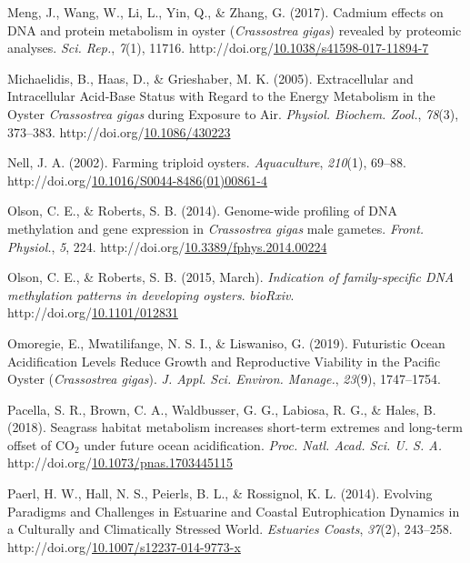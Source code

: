 \documentclass [11pt, proquest] {uwthesis}[2015/03/03]
\newlength{\cslhangindent}
\newenvironment{CSLReferences}%
{\setlength{\parindent}{0pt}%
\everypar{\setlength{\hangindent}{\cslhangindent}}\ignorespaces}%
{\par}
\begin{document}
\begin{CSLReferences}{1}{0}
\leavevmode\hypertarget{ref-Meng2017}{}%
Meng, J., Wang, W., Li, L., Yin, Q., \& Zhang, G. (2017). {Cadmium effects on DNA and protein metabolism in oyster (\emph{Crassostrea gigas}) revealed by proteomic analyses}. \emph{Sci. Rep.}, \emph{7}(1), 11716. http://doi.org/\href{https://doi.org/10.1038/s41598-017-11894-7}{10.1038/s41598-017-11894-7}

\leavevmode\hypertarget{ref-Michaelidis2005}{}%
Michaelidis, B., Haas, D., \& Grieshaber, M. K. (2005). {Extracellular and Intracellular Acid‐Base Status with Regard to the Energy Metabolism in the Oyster \emph{Crassostrea gigas} during Exposure to Air}. \emph{Physiol. Biochem. Zool.}, \emph{78}(3), 373--383. http://doi.org/\href{https://doi.org/10.1086/430223}{10.1086/430223}

\leavevmode\hypertarget{ref-Nell2002}{}%
Nell, J. A. (2002). {Farming triploid oysters}. \emph{Aquaculture}, \emph{210}(1), 69--88. http://doi.org/\href{https://doi.org/10.1016/S0044-8486(01)00861-4}{10.1016/S0044-8486(01)00861-4}

\leavevmode\hypertarget{ref-Olson2014}{}%
Olson, C. E., \& Roberts, S. B. (2014). {Genome-wide profiling of DNA methylation and gene expression in \emph{Crassostrea gigas} male gametes}. \emph{Front. Physiol.}, \emph{5}, 224. http://doi.org/\href{https://doi.org/10.3389/fphys.2014.00224}{10.3389/fphys.2014.00224}

\leavevmode\hypertarget{ref-Olson2015}{}%
Olson, C. E., \& Roberts, S. B. (2015, March). \emph{{Indication of family-specific DNA methylation patterns in developing oysters}}. \emph{bioRxiv}. http://doi.org/\href{https://doi.org/10.1101/012831}{10.1101/012831}

\leavevmode\hypertarget{ref-Omoregie2019}{}%
Omoregie, E., Mwatilifange, N. S. I., \& Liswaniso, G. (2019). {Futuristic Ocean Acidification Levels Reduce Growth and Reproductive Viability in the Pacific Oyster (\emph{Crassostrea gigas})}. \emph{J. Appl. Sci. Environ. Manage.}, \emph{23}(9), 1747--1754.

\leavevmode\hypertarget{ref-Pacella2018}{}%
Pacella, S. R., Brown, C. A., Waldbusser, G. G., Labiosa, R. G., \& Hales, B. (2018). {Seagrass habitat metabolism increases short-term extremes and long-term offset of {CO\(_2\)} under future ocean acidification}. \emph{Proc. Natl. Acad. Sci. U. S. A.} http://doi.org/\href{https://doi.org/10.1073/pnas.1703445115}{10.1073/pnas.1703445115}

\leavevmode\hypertarget{ref-Paerl2014}{}%
Paerl, H. W., Hall, N. S., Peierls, B. L., \& Rossignol, K. L. (2014). {Evolving Paradigms and Challenges in Estuarine and Coastal Eutrophication Dynamics in a Culturally and Climatically Stressed World}. \emph{Estuaries Coasts}, \emph{37}(2), 243--258. http://doi.org/\href{https://doi.org/10.1007/s12237-014-9773-x}{10.1007/s12237-014-9773-x}


\end{CSLReferences}
\end{document}
